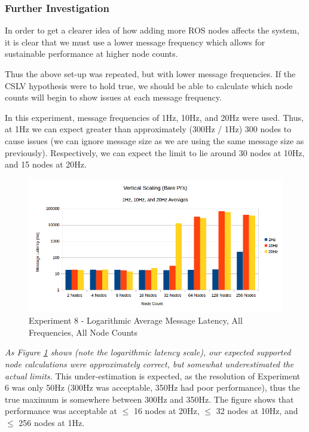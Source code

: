 \documentclass[../dissertation.tex]{subfiles}
\begin{document}
\subsubsection{Further Investigation}

In order to get a clearer idea of how adding more ROS nodes affects the system, it is clear that we must use a lower message frequency which allows for sustainable performance at higher node counts.

Thus the above set-up was repeated, but with lower message frequencies. If the CSLV hypothesis were to hold true, we should be able to calculate which node counts will begin to show issues at each message frequency.

In this experiment, message frequencies of 1Hz, 10Hz, and 20Hz were used. Thus, at 1Hz we can expect greater than approximately (300Hz / 1Hz) 300 nodes to cause issues (we can ignore message size as we are using the same message size as previously). Respectively, we can expect the limit to lie around 30 nodes at 10Hz, and 15 nodes at 20Hz.

\begin{figure}[H]
\centering
\includegraphics[width=\textwidth]{images/experiment8/vertical_scaling_all_freqs_log_avg_msg_latency.png}
\caption{Experiment 8 - Logarithmic Average Message Latency, All Frequencies, All Node Counts}
\label{exp8-all-freqs-averages}
\end{figure}

\textit{As Figure \ref{exp8-all-freqs-averages} shows (note the logarithmic latency scale), our expected supported node calculations were approximately correct, but somewhat underestimated the actual limits.} This under-estimation is expected, as the resolution of Experiment 6 was only 50Hz (300Hz was acceptable, 350Hz had poor performance), thus the true maximum is somewhere between 300Hz and 350Hz. The figure shows that performance was acceptable at $\leq$ 16 nodes at 20Hz, $\leq$ 32 nodes at 10Hz, and $\leq$ 256 nodes at 1Hz.
\end{document}
